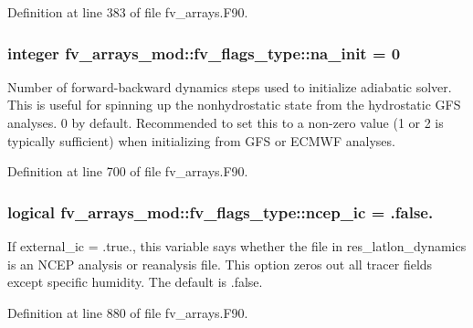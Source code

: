 Definition at line 383 of file fv\-\_\-arrays.\-F90.

\subsubsection[{na\-\_\-init}]{\setlength{\rightskip}{0pt plus 5cm}integer fv\-\_\-arrays\-\_\-mod\-::fv\-\_\-flags\-\_\-type\-::na\-\_\-init = 0}\label{structfv__arrays__mod_1_1fv__flags__type_acac30a38b5ffe8adef26e581a215157e}


Number of forward-\/backward dynamics steps used to initialize adiabatic solver. This is useful for spinning up the nonhydrostatic state from the hydrostatic G\-F\-S analyses. 0 by default. Recommended to set this to a non-\/zero value (1 or 2 is typically sufficient) when initializing from G\-F\-S or E\-C\-M\-W\-F analyses. 



Definition at line 700 of file fv\-\_\-arrays.\-F90.

\subsubsection[{ncep\-\_\-ic}]{\setlength{\rightskip}{0pt plus 5cm}logical fv\-\_\-arrays\-\_\-mod\-::fv\-\_\-flags\-\_\-type\-::ncep\-\_\-ic = .false.}\label{structfv__arrays__mod_1_1fv__flags__type_afbe96b343538a9871a35409abfdb09d3}


If external\-\_\-ic = .true., this variable says whether the file in res\-\_\-latlon\-\_\-dynamics is an N\-C\-E\-P analysis or reanalysis file. This option zeros out all tracer fields except specific humidity. The default is .false. 



Definition at line 880 of file fv\-\_\-arrays.\-F90.

